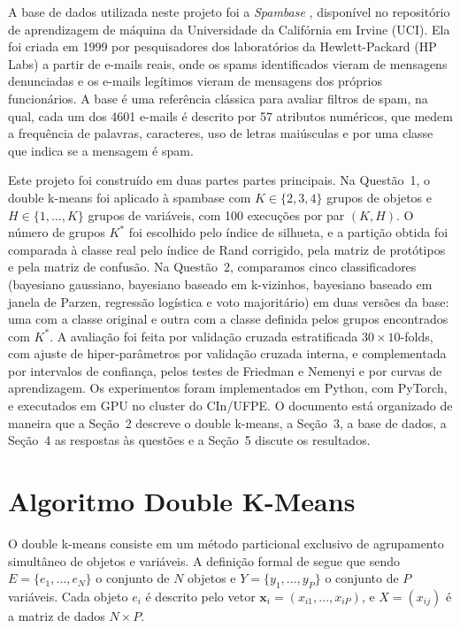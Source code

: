\documentclass[12pt,reqno]{amsart}
\begin{document}
A base de dados utilizada neste projeto foi a \emph{Spambase} \cite{spambase}, disponível no repositório de
aprendizagem de máquina da Universidade da Califórnia em Irvine (UCI). Ela foi criada em 1999 por
pesquisadores dos laboratórios da Hewlett-Packard (HP Labs) a partir de e-mails reais, onde os spams identificados
vieram de mensagens denunciadas e os e-mails legítimos vieram de mensagens dos próprios funcionários. A base é uma referência clássica para avaliar filtros
de spam, na qual, cada um dos 4601 e-mails é descrito por 57 atributos
numéricos, que medem a frequência de palavras, caracteres, uso de letras maiúsculas e por
uma classe que indica se a mensagem é spam. 

Este projeto foi construído em duas partes partes principais. Na Questão~1, o double k-means foi aplicado à spambase
com $K\in\{2,3,4\}$ grupos de objetos e $H\in\{1,\dots,K\}$ grupos de variáveis, com 100
execuções por par $(K,H)$. O número de grupos $K^*$ foi escolhido pelo índice de silhueta, e a
partição obtida foi comparada à classe real pelo índice de Rand corrigido, pela matriz de
protótipos e pela matriz de confusão. Na Questão~2, comparamos cinco classificadores
(bayesiano gaussiano, bayesiano baseado em k-vizinhos, bayesiano baseado em janela de Parzen,
regressão logística e voto majoritário) em duas versões da base: uma com a classe original e
outra com a classe definida pelos grupos encontrados com $K^*$. A avaliação foi feita por
validação cruzada estratificada $30\times10$-folds, com ajuste de hiper-parâmetros por validação
cruzada interna, e complementada por intervalos de confiança, pelos testes de Friedman e Nemenyi
\cite{demsar2006} e por curvas de aprendizagem. Os experimentos foram implementados em Python, com PyTorch, e executados em GPU no
cluster do CIn/UFPE. O documento está organizado de maneira que a Seção~2 descreve o double k-means, a
Seção~3, a base de dados, a Seção~4 as respostas às questões e a Seção~5 discute os
resultados.

\section{Algoritmo Double K-Means}

O double k-means consiste em um método particional exclusivo de
agrupamento simultâneo de objetos e variáveis. A definição formal de  segue que sendo $E=\{e_1,\dots,e_N\}$ o conjunto de $N$ objetos e $Y=\{y_1,\dots,y_P\}$ o conjunto de $P$
variáveis. Cada objeto $e_i$ é descrito pelo vetor $\mathbf{x}_i=(x_{i1},\dots,x_{iP})$, e
$X=(x_{ij})$ é a matriz de dados $N\times P$. 
\end{document}
